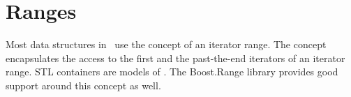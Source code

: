 \section{Ranges} 

Most data structures in \cgal\ use the concept of an iterator range.  The
 concept encapsulates the access to the first and the past-the-end
iterators of an iterator range.  STL containers are models of .
The Boost.Range library provides good support around this concept as well.
